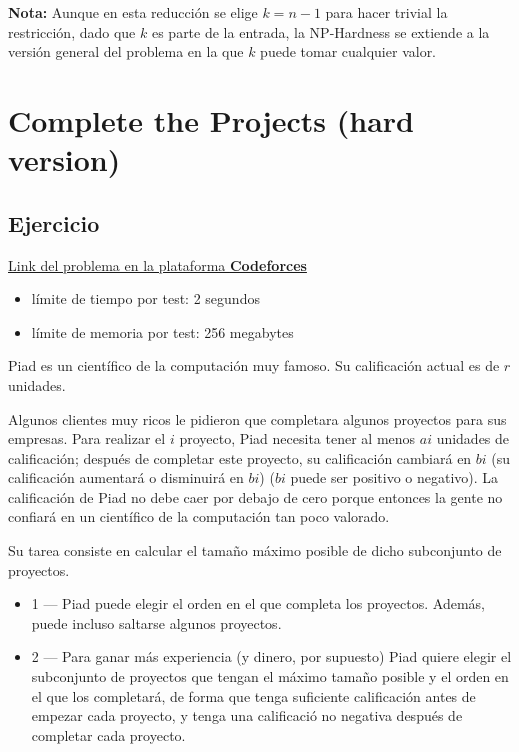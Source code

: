 ﻿\documentclass{article}
\theoremstyle{plain}
\theoremstyle{definition}
\begin{document}
\medskip

\textbf{Nota:} Aunque en esta reducción se elige $k=n-1$ para hacer trivial la restricción, dado que $k$ es parte de la entrada, la NP-Hardness se extiende a la versión general del problema en la que $k$ puede tomar cualquier valor.


\section{Complete the Projects (hard version)}

\subsection{Ejercicio}

\href{https://codeforces.com/contest/1203/problem/F2}{Link del problema en la plataforma \textbf{Codeforces}}

\begin{itemize}
    \item límite de tiempo por test: 2 segundos
    \item límite de memoria por test: 256 megabytes
\end{itemize}

Piad es un científico de la computación muy famoso. Su calificación actual es de $r$ unidades.

Algunos clientes muy ricos le pidieron que completara algunos proyectos para sus empresas. Para realizar el $i$ proyecto, Piad necesita tener al menos $ai$ unidades de calificación; después de completar este proyecto, su calificación cambiará en $bi$ (su calificación aumentará o disminuirá en $bi$) ($bi$ puede ser positivo o negativo). La calificación de Piad no debe caer por debajo de cero porque entonces la gente no confiará en un científico de la computación tan poco valorado.

Su tarea consiste en calcular el tamaño máximo posible de dicho subconjunto de proyectos.

\begin{itemize}
    \item 1 — Piad puede elegir el orden en el que completa los proyectos. Además, puede incluso saltarse algunos proyectos.
    \item 2 — Para ganar más experiencia (y dinero, por supuesto) Piad quiere elegir el subconjunto de proyectos que tengan el máximo tamaño posible y el orden en el que los completará, de forma que tenga suficiente calificación antes de empezar cada proyecto, y tenga una calificació no negativa después de completar cada proyecto.
\end{itemize}
\end{document}
